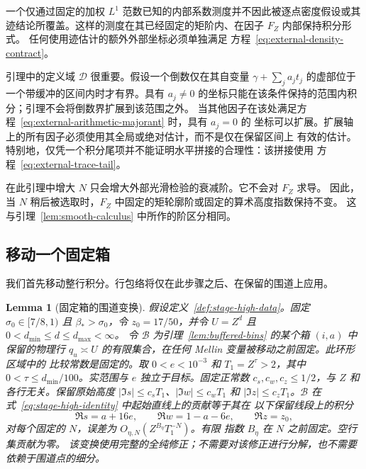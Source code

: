 \documentclass[11pt,a4paper]{article}
\numberwithin{equation}{section}
\numberwithin{figure}{section}
\newtheorem{lemma}[theorem]{Lemma}
\theoremstyle{definition}
\theoremstyle{remark}
\begin{document}
一个仅通过固定的加权 $L^1$ 范数已知的内部系数测度并不因此被逐点密度假设或其
迹结论所覆盖。这样的测度在其已经固定的矩阶内、在因子 $F_Z$ 内部保持积分形式。
任何使用迹估计的额外外部坐标必须单独满足
方程~\eqref{eq:external-density-contract}。

引理中的定义域 $\mathcal D$ 很重要。假设一个倒数仅在其自变量
$\gamma+\sum_j a_jt_j$ 的虚部位于一个带缓冲的区间内时才有界。具有
$a_j\ne0$ 的坐标只能在该条件保持的范围内积分；引理不会将倒数界扩展到该范围之外。
当其他因子在该处满足方程~\eqref{eq:external-arithmetic-majorant} 时，具有 $a_j=0$ 的
坐标可以扩展。扩展轴上的所有因子必须使用其全局或绝对估计，而不是仅在保留区间上
有效的估计。特别地，仅凭一个积分尾项并不能证明水平拼接的合理性：该拼接使用
方程~\eqref{eq:external-trace-tail}。

在此引理中增大 $N$ 只会增大外部光滑检验的衰减阶。它不会对 $F_Z$ 求导。
因此，当 $N$ 稍后被选取时，$F_Z$ 中固定的矩轮廓阶或固定的算术高度指数保持不变。
这与引理~\ref{lem:smooth-calculus} 中所作的阶区分相同。

\subsection{移动一个固定箱}

我们首先移动整行积分。行包络将仅在此步骤之后、在保留的围道上应用。

\begin{lemma}[固定箱的围道变换]
\label{lem:fixed-bin-contour}
假设定义~\ref{def:stage-high-data}。固定
$\sigma_0\in[7/8,1)$ 且 $\beta_*>\sigma_0$，令 $z_0=17/50$，并令
$U=Z^d$ 且 $0<d_{\min}\le d\le d_{\max}<\infty$。
令 $\mathcal B$ 为引理~\ref{lem:buffered-bins} 的某个箱 $(i,a)$ 中保留的物理行
$q_u\asymp U$ 的有限集合，在任何 Mellin 变量被移动之前固定。此环形区域中的
比较常数是固定的。取 $0<e<10^{-3}$ 和 $T_1=Z^\tau>2$，其中
$0<\tau\le d_{\min}/100$。实范围与 $e$ 独立于目标。固定正常数 $c_s,c_w,c_z\le1/2$，与 $Z$ 和各行无关。保留原始高度
$|\Im s|\le c_sT_1$、$|\Im w|\le c_wT_1$ 和
$|\Im z|\le c_zT_1$。$\mathcal B$ 在式~\eqref{eq:stage-high-identity} 中起始直线上的贡献等于其在
以下保留线段上的积分
\begin{equation}
 \Re s=a+16e,\qquad \Re w=1-a-6e,\qquad \Re z=z_0,
 \label{eq:stage-central-contours}
\end{equation}
对每个固定的 $N$，误差为 $O_{\eta,N}(Z^{B_\eta}T_1^{-N})$。有限
指数 $B_\eta$ 在 $N$ 之前固定。空行集贡献为零。
该变换使用完整的全纯修正；不需要对该修正进行分解，也不需要依赖于围道点的细分。
\end{lemma}
\end{document}
